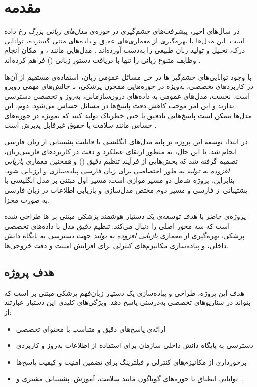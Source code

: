 \documentclass[11pt, a4paper, oneside]{book}
\begin{document}
	\chapter{مقدمه}

	در سال‌های اخیر، پیشرفت‌های چشم‌گیری در حوزه‌ی \textit{مدل‌های زبانی بزرگ}  رخ داده است. این مدل‌ها با بهره‌گیری از معماری‌های عمیق و داده‌های متنی گسترده، توانایی درک، تحلیل و تولید زبان طبیعی را به‌دست آورده‌اند \cite{brown_language_2020}. مدل‌هایی مانند ،  و  امکان انجام وظایف متنوع زبانی را تنها با دریافت دستور زبانی () فراهم کرده‌اند \cite{raffel2020exploring}.

	با وجود توانایی‌های چشم‌گیر ها در حل مسائل عمومی زبان، استفاده‌ی مستقیم از آن‌ها در کاربردهای تخصصی، به‌ویژه در حوزه‌هایی همچون پزشکی، با چالش‌های مهمی روبرو است. نخست، مدل‌های عمومی به داده‌های درون‌سازمانی، به‌روز و تخصصی دسترسی ندارند و این امر موجب کاهش دقت پاسخ‌ها در مسائل حساس می‌شود. دوم، این مدل‌ها ممکن است پاسخ‌هایی نادقیق یا حتی خطرناک تولید کنند که به‌ویژه در حوزه‌های حساس مانند سلامت یا حقوق غیرقابل پذیرش است \cite{hallucinationguardrails2023openai}.

	در ابتدا، توسعه این پروژه بر پایه مدل‌های انگلیسی با قابلیت پشتیبانی از زبان فارسی انجام شد. با این حال، به منظور ارتقای عملکرد و دقت در کاربردهای فارسی‌زبان، تصمیم گرفته شد که بخش‌هایی از فرآیند تنظیم دقیق () و همچنین معماری \textit{بازیابی افزوده به تولید}  به طور اختصاصی برای زبان فارسی پیاده‌سازی و ارزیابی شود. بنابراین، پروژه شامل دو مسیر موازی است: مسیر اول مبتنی بر مدل انگلیسی با پشتیبانی از فارسی و مسیر دوم مختص مدل‌سازی و بازیابی اطلاعات در زبان فارسی به صورت مجزا.

	پروژه‌ی حاضر با هدف توسعه‌ی یک دستیار هوشمند پزشکی مبتنی بر ها طراحی شده است که سه محور اصلی را دنبال می‌کند: تنظیم دقیق مدل با داده‌های تخصصی پزشکی، بهره‌گیری از معماری \textit{بازیابی افزوده به تولید} جهت دسترسی به پایگاه دانش داخلی، و پیاده‌سازی مکانیزم‌های کنترلی برای افزایش امنیت و دقت خروجی‌ها.

	\section{هدف پروژه}

	هدف این پروژه، طراحی و پیاده‌سازی یک دستیار زبان‌فهم پزشکی مبتنی بر  است که بتواند در سناریوهای تخصصی به‌درستی پاسخ دهد. ویژگی‌های کلیدی این دستیار عبارتند از:

	\begin{itemize}
		\item ارائه‌ی پاسخ‌های دقیق و متناسب با محتوای تخصصی
		\item دسترسی به پایگاه دانش داخلی سازمان برای استفاده از اطلاعات به‌روز و کاربردی
		\item برخورداری از مکانیزم‌های کنترلی و فیلترینگ برای تضمین امنیت و کیفیت پاسخ‌ها
		\item توانایی انطباق با حوزه‌های گوناگون مانند سلامت، آموزش، پشتیبانی مشتری و...
	\end{itemize}
\end{document}
